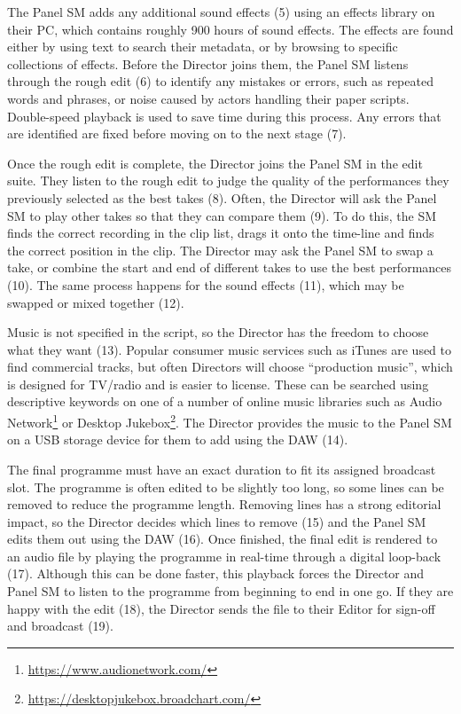 The Panel SM adds any additional sound effects (5) using an effects library on their PC, which contains roughly 900
hours of sound effects.  The effects are found either by using text to search their metadata, or by browsing to
specific collections of effects.  Before the Director joins them, the Panel SM listens through the rough edit (6) to
identify any mistakes or errors, such as repeated words and phrases, or noise caused by actors handling their paper
scripts.  Double-speed playback is used to save time during this process. Any errors that are identified are fixed
before moving on to the next stage (7).

Once the rough edit is complete, the Director joins the Panel SM in the edit suite. They listen to the rough edit to
judge the quality of the performances they previously selected as the best takes (8).  Often, the Director will ask the
Panel SM to play other takes so that they can compare them (9).  To do this, the SM finds the correct recording in the
clip list, drags it onto the time-line and finds the correct position in the clip.  The Director may ask the Panel SM
to swap a take, or combine the start and end of different takes to use the best performances (10).  The same process
happens for the sound effects (11), which may be swapped or mixed together (12).

Music is not specified in the script, so the Director has the freedom to choose what they want (13). Popular consumer
music services such as iTunes are used to find commercial tracks, but often Directors will choose ``production music'',
which is designed for TV/radio and is easier to license. These can be searched using descriptive keywords on one of a
number of online music libraries such as Audio Network\footnote{\url{https://www.audionetwork.com/}} or Desktop
Jukebox\footnote{\url{https://desktopjukebox.broadchart.com/}}.  The Director provides the music to the Panel SM on a
USB storage device for them to add using the DAW (14).

The final programme must have an exact duration to fit its assigned broadcast slot. The programme is often edited to be
slightly too long, so some lines can be removed to reduce the programme length. Removing lines has a strong editorial
impact, so the Director decides which lines to remove (15) and the Panel SM edits them out using the DAW (16).  Once
finished, the final edit is rendered to an audio file by playing the programme in real-time through a digital loop-back
(17). Although this can be done faster, this playback forces the Director and Panel SM to listen to the programme from
beginning to end in one go. If they are happy with the edit (18), the Director sends the file to their Editor for
sign-off and broadcast (19).

